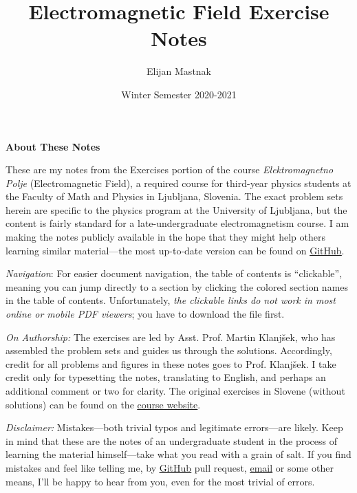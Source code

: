 \documentclass[11pt, a4paper]{article}
\begin{document}
\title{Electromagnetic Field Exercise Notes}
\author{Elijan Mastnak}
\date{Winter Semester 2020-2021}
\maketitle

\thispagestyle{empty}  %

\begin{center}
\textbf{About These Notes}
\end{center}
These are my notes from the Exercises portion of the course \textit{Elektromagnetno Polje} (Electromagnetic Field), a required course for third-year physics students at the Faculty of Math and Physics in Ljubljana, Slovenia. The exact problem sets herein are specific to the physics program at the University of Ljubljana, but the content is fairly standard for a late-undergraduate electromagnetism course. I am making the notes publicly available in the hope that they might help others learning similar material---the most up-to-date version can be found on \href{https://github.com/ejmastnak/fmf/tree/main/electromagnetic-field}{\underline{GitHub}}.

\vspace{2mm}
\textit{Navigation}: For easier document navigation, the table of contents is ``clickable'', meaning you can jump directly to a section by clicking the colored section names in the table of contents. Unfortunately, \textit{the clickable links do not work in most online or mobile PDF viewers}; you have to download the file first.

\vspace{2mm}
\textit{On Authorship:} 
The exercises are led by Asst. Prof. Martin Klanj\v{s}ek, who has assembled the problem sets and guides us through the solutions. Accordingly, credit for all problems and figures in these notes goes to Prof. Klanj\v{s}ek. I take credit only for typesetting the notes, translating to English, and perhaps an additional comment or two for clarity. The original exercises in Slovene (without solutions) can be found on the \href{https://www-f5.ijs.si/emp-2020-2021.html}{\underline{course website}}. 

\vspace{2mm}
\textit{Disclaimer:} Mistakes---both trivial typos and legitimate errors---are likely. Keep in mind that these are the notes of an undergraduate student in the process of learning the material himself---take what you read with a grain of salt. If you find mistakes and feel like telling me, by \href{https://github.com/ejmastnak/fmf}{\underline{GitHub}} pull request, \href{mailto:ejmastnak@gmail.com}{\underline{email}} or some other means, I'll be happy to hear from you, even for the most trivial of errors.
\end{document}
